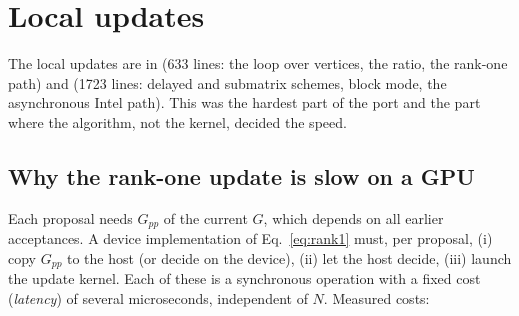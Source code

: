 \section{Local updates}
\label{sec:updates}

The local updates are in  (633 lines: the loop over vertices, the ratio, the rank-one path) and  (1723 lines: delayed and submatrix schemes, block mode, the asynchronous Intel path). This was the hardest part of the port and the part where the algorithm, not the kernel, decided the speed.

\subsection{Why the rank-one update is slow on a GPU}

Each proposal needs $G_{pp}$ of the current $G$, which depends on all earlier acceptances. A device implementation of Eq.~\eqref{eq:rank1} must, per proposal, (i) copy $G_{pp}$ to the host (or decide on the device), (ii) let the host decide, (iii) launch the update kernel. Each of these is a synchronous operation with a fixed cost (\emph{latency}) of several microseconds, independent of $N$. Measured costs:

